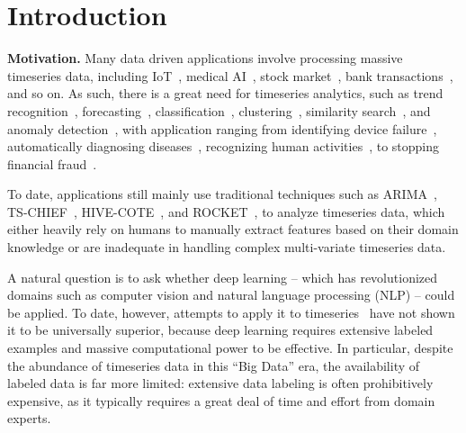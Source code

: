 \section{Introduction}
\label{sec.intro}
\noindent\textbf{Motivation.} Many data driven applications involve processing massive timeseries data, including IoT~\cite{cook2019anomaly}, medical AI~\cite{crabtree1990individual}, stock market~\cite{kraft1977determinants}, bank transactions~\cite{soro2020regular}, and so on. As such, there is a great need for timeseries analytics, such as trend recognition~\cite{shimakawa1992trend}, forecasting~\cite{chatfield2000time}, classification~\cite{ismail2019deep}, clustering~\cite{liao2005clustering}, similarity search~\cite{negi2005time}, and anomaly detection~\cite{teng2010anomaly}, with application ranging from identifying device failure~\cite{sun2019system}, automatically diagnosing diseases~\cite{bui2017time}, recognizing human activities~\cite{lara2012survey}, to stopping financial fraud~\cite{yue2007review}. 

To date, applications still mainly use traditional techniques such as ARIMA~\cite{arima}, TS-CHIEF~\cite{Shifaz2020TSCHIEFAS}, HIVE-COTE~\cite{10.1145/3182382}, and ROCKET~\cite{DBLP:journals/datamine/DempsterPW20}, to analyze timeseries data, which either heavily rely on humans to manually extract features based on their domain knowledge or are inadequate in handling complex multi-variate timeseries data.

A natural question is to ask whether deep learning -- which has revolutionized domains such as computer vision and natural language processing (NLP) -- could be applied.
To date, however, attempts to apply it to timeseries~\cite{DBLP:conf/kdd/ZerveasJPBE21} have not shown it to be universally superior, because deep learning requires extensive labeled examples and massive computational power to be effective.
In particular, despite the abundance of timeseries data in this ``Big Data'' era, the availability of labeled data is far more limited: extensive data labeling is often prohibitively expensive, as it typically requires a great deal of time and effort from domain experts.  


